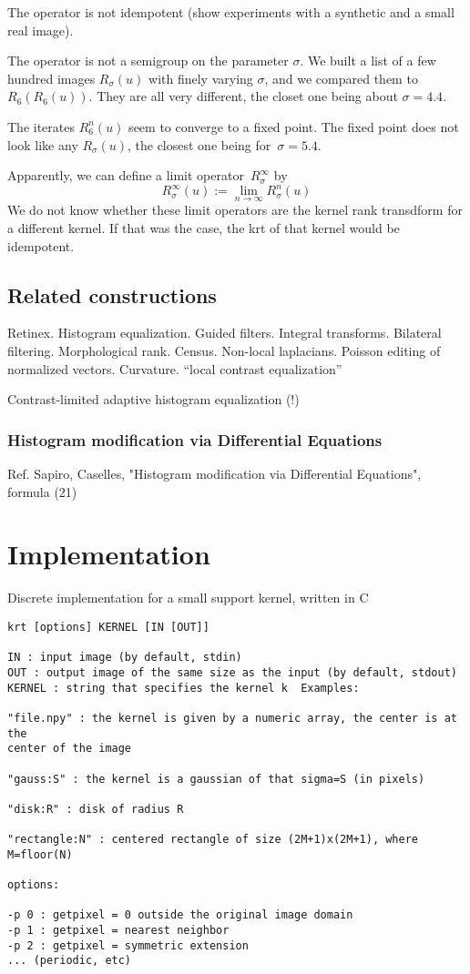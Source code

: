 \documentclass[12pt]{article}                  %
\begin{document}
The operator is not idempotent (show experiments with a synthetic and a small real image).

The operator is not a semigroup on the parameter $\sigma$.  We built a list of a few hundred images $R_\sigma(u)$ with finely varying $\sigma$, and we compared them to $R_6(R_6(u))$.  They are all very different, the closet one being about $\sigma=4.4$.

The iterates $R_6^n(u)$ seem to converge to a fixed point.  The fixed point does not look like any $R_\sigma(u)$, the closest one being for~$\sigma=5.4$.

Apparently, we can define a limit operator~$R^\infty_\sigma$ by
\[
R^\infty_\sigma(u) := \lim_{n\to\infty}R^n_\sigma(u)
\]
We do not know whether these limit operators are the kernel rank transdform for a different kernel.   If that was the case, the krt of that kernel  would be idempotent.   

\subsection{Related constructions}

Retinex.  Histogram equalization.  Guided filters.  Integral transforms.
Bilateral filtering.
Morphological rank.  Census.  Non-local laplacians.  Poisson editing of
normalized vectors.  Curvature. ``local contrast equalization''

Contrast-limited adaptive histogram equalization (!)


\subsubsection{Histogram modification via Differential Equations}

Ref. Sapiro, Caselles,  "Histogram modification via Differential Equations",
formula (21)

\section{Implementation}

Discrete implementation for a small support kernel, written in C

{\small
\begin{verbatim}
krt [options] KERNEL [IN [OUT]]

IN : input image (by default, stdin)
OUT : output image of the same size as the input (by default, stdout)
KERNEL : string that specifies the kernel k  Examples:

"file.npy" : the kernel is given by a numeric array, the center is at the
center of the image

"gauss:S" : the kernel is a gaussian of that sigma=S (in pixels)

"disk:R" : disk of radius R

"rectangle:N" : centered rectangle of size (2M+1)x(2M+1), where M=floor(N)

options:

-p 0 : getpixel = 0 outside the original image domain
-p 1 : getpixel = nearest neighbor
-p 2 : getpixel = symmetric extension
... (periodic, etc)

\end{verbatim}
}
\end{document}
